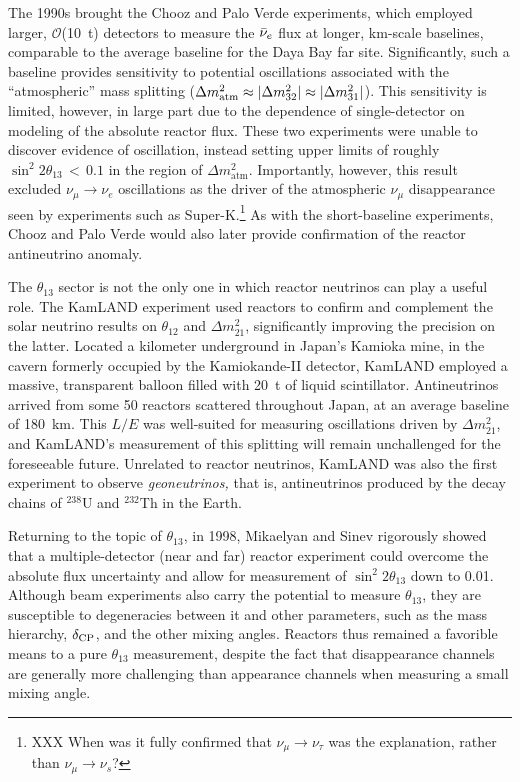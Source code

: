 \documentclass[../thesis.tex]{subfiles}
\begin{document}
The 1990s brought the Chooz and Palo Verde experiments, which employed larger,
$\mathcal{O}$(10~t) detectors to measure the $\bar\nu_e$ flux at longer, km-scale
baselines, comparable to the average baseline for the Daya Bay far
site. Significantly, such a baseline provides sensitivity to potential
oscillations associated with the ``atmospheric'' mass splitting ($\Delta
m^2_{\mathrm{atm}} \approx \lvert \Delta m^2_{32}\rvert \approx \lvert \Delta
  m^2_{31}\rvert$). This sensitivity is limited, however, in large part due to the
dependence of single-detector on modeling of the absolute reactor flux. These
two experiments were unable to discover evidence of oscillation, instead setting
upper limits of roughly $\sin^2 2\theta_{13}\,<\,0.1$ in the region of $\Delta
m^2_{\mathrm{atm}}$. Importantly, however, this result excluded $\nu_\mu
\rightarrow \nu_e$ oscillations as the driver of the atmospheric $\nu_\mu$
disappearance seen by experiments such as Super-K.\footnote{XXX When was it
  fully confirmed that $\nu_\mu \rightarrow \nu_\tau$ was the explanation,
  rather than $\nu_\mu \rightarrow \nu_s$? } As with the short-baseline
experiments, Chooz and Palo Verde would also later provide confirmation of the
reactor antineutrino anomaly.

The $\theta_{13}$ sector is not the only one in which reactor neutrinos can play
a useful role. The KamLAND experiment used reactors to confirm and complement
the solar neutrino results on $\theta_{12}$ and $\Delta m^2_{21}$, significantly
improving the precision on the latter. Located a kilometer underground in
Japan's Kamioka mine, in the cavern formerly occupied by the Kamiokande-II
detector, KamLAND employed a massive, transparent balloon filled with 20~t of
liquid scintillator. Antineutrinos arrived from some 50 reactors scattered
throughout Japan, at an average baseline of 180~km. This $L/E$ was well-suited
for measuring oscillations driven by $\Delta m^2_{21}$, and KamLAND's
measurement of this splitting will remain unchallenged for the foreseeable
future. Unrelated to reactor neutrinos, KamLAND was also the first experiment to
observe \emph{geoneutrinos,} that is, antineutrinos produced by the decay chains
of $^{238}$U and $^{232}$Th in the Earth.

Returning to the topic of $\theta_{13}$, in 1998, Mikaelyan and Sinev rigorously
showed that a multiple-detector (near and far) reactor experiment could overcome
the absolute flux uncertainty and allow for measurement of $\sin^2 2\theta_{13}$
down to 0.01. Although beam experiments also carry the potential to measure
$\theta_{13}$, they are susceptible to degeneracies between it and other
parameters, such as the mass hierarchy, $\delta_\text{CP}$, and the other mixing
angles. Reactors thus remained a favorible means to a pure $\theta_{13}$
measurement, despite the fact that disappearance channels are generally more
challenging than appearance channels when measuring a small mixing angle.
\end{document}

